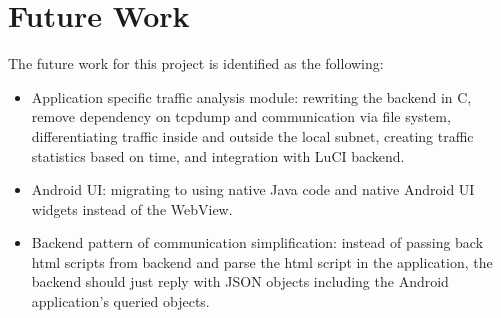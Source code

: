 \section{Future Work}

The future work for this project is identified as the following:

\begin{itemize}

\item Application specific traffic analysis module: rewriting the backend in C, remove dependency on tcpdump and communication via file system, differentiating traffic inside and outside the local subnet, creating traffic statistics based on time, and integration with LuCI backend.

\item Android UI: migrating to using native Java code and native Android UI widgets instead of the WebView.

\item Backend pattern of communication simplification: instead of passing back html scripts from backend and parse the html script in the application, the backend should just reply with JSON objects including the Android application's queried objects.

\end{itemize}